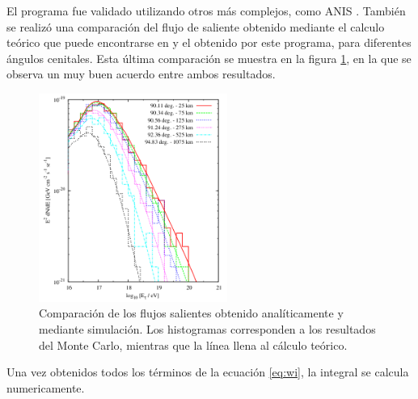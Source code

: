		El programa fue validado utilizando otros m\'as complejos, como ANIS \cite{anis}.
		Tambi\'en se realiz\'o una comparaci\'on del flujo de \tauon{} saliente obtenido mediante el calculo te\'orico que puede encontrarse en \cite{prop_tau} y el obtenido por este programa, para diferentes \'angulos cenitales.
		Esta \'ultima comparaci\'on se muestra en la figura \ref{fig:comp_tau_mc_teo}, en la que se observa un muy buen acuerdo entre ambos resultados.
		\begin{figure}[ht!]
			\begin{center}
			\includegraphics[width=0.55\textwidth]{fig/simulacionAuger/comp_tau_mc_teo}
			\caption{\label{fig:comp_tau_mc_teo} Comparaci\'on de los flujos salientes obtenido anal\'iticamente y mediante simulaci\'on. Los histogramas corresponden a los resultados del Monte Carlo, mientras que la l\'inea llena al c\'alculo te\'orico.}
			\end{center}
		\end{figure}
		
		
		Una vez obtenidos todos los términos de la ecuación \ref{eq:wi}, la integral se calcula numericamente.
